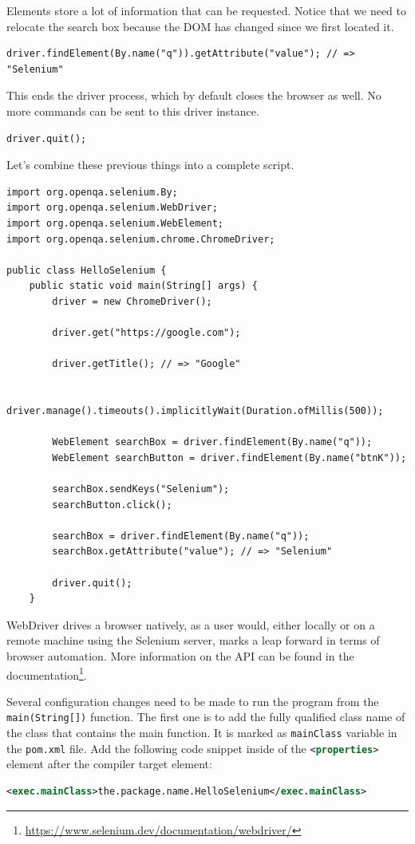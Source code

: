 Elements store a lot of information that can be requested. Notice that we need to relocate the search box because the DOM has changed since we first located it.
\begin{lstlisting}
driver.findElement(By.name("q")).getAttribute("value"); // => "Selenium"
\end{lstlisting}

This ends the driver process, which by default closes the browser as well. No more commands can be sent to this driver instance.
\begin{lstlisting}
driver.quit();
\end{lstlisting}

Let’s combine these previous things into a complete script.
\begin{lstlisting}[caption={The complete example to open Google and search for Selenium.}]
import org.openqa.selenium.By;
import org.openqa.selenium.WebDriver;
import org.openqa.selenium.WebElement;
import org.openqa.selenium.chrome.ChromeDriver;

public class HelloSelenium {
    public static void main(String[] args) {
        driver = new ChromeDriver();

        driver.get("https://google.com");
        
        driver.getTitle(); // => "Google"

        driver.manage().timeouts().implicitlyWait(Duration.ofMillis(500));
        
        WebElement searchBox = driver.findElement(By.name("q"));
        WebElement searchButton = driver.findElement(By.name("btnK"));
        
        searchBox.sendKeys("Selenium");
        searchButton.click();
        
        searchBox = driver.findElement(By.name("q"));
        searchBox.getAttribute("value"); // => "Selenium"
        
        driver.quit();
    }
\end{lstlisting}

WebDriver drives a browser natively, as a user would, either locally or on a remote machine using the Selenium server, marks a leap forward in terms of browser automation. More information on the API can be found in the documentation\footnote{\url{https://www.selenium.dev/documentation/webdriver/}}.

Several configuration changes need to be made to run the program from the \lstinline!main(String[])! function. The first one is to add the fully qualified class name of the class that contains the main function. It is marked as \lstinline!mainClass! variable in the \lstinline!pom.xml! file. Add the following code snippet inside of the \lstinline[language=XML]!<properties>! element after the compiler target element:
\begin{lstlisting}[language=XML]
<exec.mainClass>the.package.name.HelloSelenium</exec.mainClass>
\end{lstlisting}

